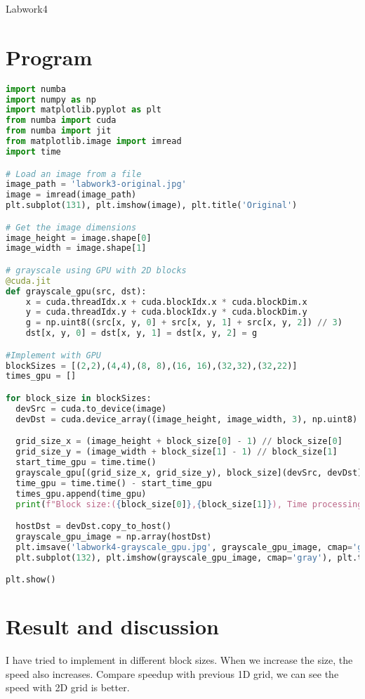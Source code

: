 \documentclass[12pt]{article}
\begin{document}
\begin{center}
    \vspace*{1.8cm}
    \Large
    Labwork4\\
\end{center}

\section{Program}
\begin{lstlisting}[language=Python]
import numba
import numpy as np
import matplotlib.pyplot as plt
from numba import cuda
from numba import jit
from matplotlib.image import imread
import time

# Load an image from a file
image_path = 'labwork3-original.jpg'
image = imread(image_path)
plt.subplot(131), plt.imshow(image), plt.title('Original')

# Get the image dimensions
image_height = image.shape[0]
image_width = image.shape[1]

# grayscale using GPU with 2D blocks
@cuda.jit
def grayscale_gpu(src, dst):
    x = cuda.threadIdx.x + cuda.blockIdx.x * cuda.blockDim.x
    y = cuda.threadIdx.y + cuda.blockIdx.y * cuda.blockDim.y
    g = np.uint8((src[x, y, 0] + src[x, y, 1] + src[x, y, 2]) // 3)
    dst[x, y, 0] = dst[x, y, 1] = dst[x, y, 2] = g

#Implement with GPU
blockSizes = [(2,2),(4,4),(8, 8),(16, 16),(32,32),(32,22)]
times_gpu = []

for block_size in blockSizes:
  devSrc = cuda.to_device(image)
  devDst = cuda.device_array((image_height, image_width, 3), np.uint8)

  grid_size_x = (image_height + block_size[0] - 1) // block_size[0]
  grid_size_y = (image_width + block_size[1] - 1) // block_size[1]
  start_time_gpu = time.time()
  grayscale_gpu[(grid_size_x, grid_size_y), block_size](devSrc, devDst)
  time_gpu = time.time() - start_time_gpu
  times_gpu.append(time_gpu)
  print(f"Block size:({block_size[0]},{block_size[1]}), Time processing on GPU: {time_gpu}s")

  hostDst = devDst.copy_to_host()
  grayscale_gpu_image = np.array(hostDst)
  plt.imsave('labwork4-grayscale_gpu.jpg', grayscale_gpu_image, cmap='gray')
  plt.subplot(132), plt.imshow(grayscale_gpu_image, cmap='gray'), plt.title('Grayscale (GPU)')

plt.show()
\end{lstlisting}

\section{Result and discussion}
I have tried to implement in different block sizes. When we increase the size, the speed also increases.
Compare speedup with previous 1D grid, we can see the speed with 2D grid is better.
\end{document}
